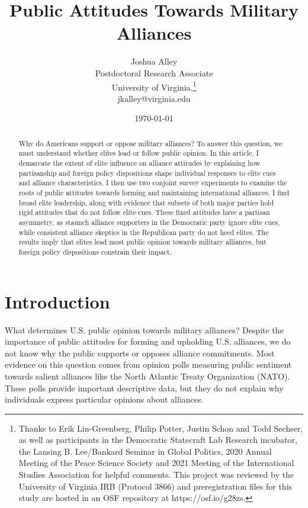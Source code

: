 \documentclass[12pt]{article}
\title{\textbf{Public Attitudes Towards Military Alliances}}
\author{Joshua Alley \\
Postdoctoral Research Associate \\
University of Virginia.\thanks{Thanks to Erik Lin-Greenberg, Philip Potter, Justin Schon and Todd Sechser, as well as participants in the Democratic Statecraft Lab Research incubator, the Lansing B. Lee/Bankard Seminar in Global Politics, 2020 Annual Meeting of the Peace Science Society and 2021 Meeting of the International Studies Association for helpful comments. This project was reviewed by the University of Virginia IRB (Protocol 3866) and preregistration files for this study are hosted in an OSF repository at https://osf.io/g28zs.} \\
jkalley@virginia.edu
}
\date{\today}
\begin{document}
\maketitle 

\doublespace 

\begin{abstract}
Why do Americans support or oppose military alliances? 
To answer this question, we must understand whether elites lead or follow public opinion.  
In this article, I demarcate the extent of elite influence on alliance attitudes by explaining how partisanship and foreign policy dispositions shape individual responses to elite cues and alliance characteristics. 
I then use two conjoint survey experiments to examine the roots of public attitudes towards forming and maintaining international alliances.  
I find broad elite leadership, along with evidence that subsets of both major parties hold rigid attitudes that do not follow elite cues. 
These fixed attitudes have a partisan asymmetry, as staunch alliance supporters in the Democratic party ignore elite cues, while consistent alliance skeptics in the Republican party do not heed elites.  
The results imply that elites lead most public opinion towards military alliances, but foreign policy dispositions constrain their impact.  
\end{abstract}


\newpage 


\section{Introduction}

What determines U.S. public opinion towards military alliances? 
Despite the importance of public attitudes for forming and upholding U.S. alliances, we do not know why the public supports or opposes alliance commitments. 
Most evidence on this question comes from opinion polls measuring public sentiment towards salient alliances like the North Atlantic Treaty Organization (NATO).
These polls provide important descriptive data, but they do not explain why individuals express particular opinions about alliances. 
\end{document}
